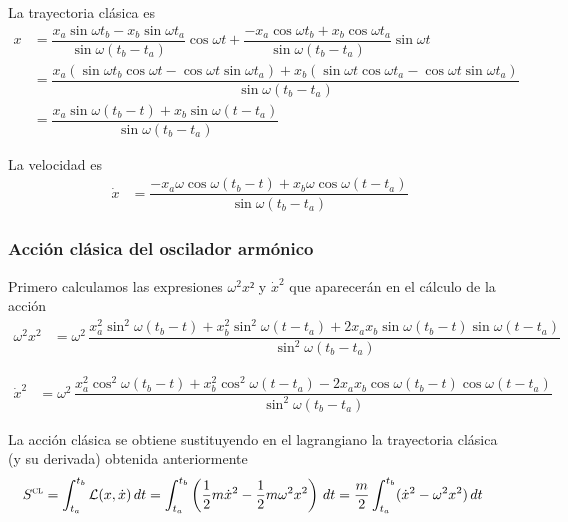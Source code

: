   La trayectoria clásica es
  \begin{align*}
    x
    &=
    \dfrac{x_a\sin\omega t_b-x_b\sin\omega t_a}{\sin\omega(t_b-t_a)} \cos\omega t
    +
    \dfrac{-x_a\cos\omega t_b+x_b\cos\omega t_a}{\sin\omega(t_b-t_a)} \sin\omega t\\
    &=
        \dfrac{x_a(\sin\omega t_b\cos\omega t-\cos\omega t \sin\omega t_a)
        + x_b(\sin\omega t \cos\omega t_a - \cos\omega t \sin\omega t_a)}
        {\sin\omega(t_b-t_a)}\\
    &=
      \dfrac{x_a\sin\omega (t_b-t) + x_b\sin\omega (t-t_a)}{\sin\omega(t_b-t_a)}
  \end{align*}

  La velocidad es
\begin{align*}
  \dot{x}
    &=
      \dfrac{-x_a\omega\cos\omega (t_b-t) + x_b\omega\cos\omega (t-t_a)}{\sin\omega(t_b-t_a)}
\end{align*}
  
\subsubsection{Acción clásica del oscilador armónico}
Primero calculamos las expresiones $\omega^2x²$ y $\dot{x}^2$ que
aparecerán en el cálculo de la acción
\begin{align*}
  \omega^2x^2
  &=
    \omega^2\,
    \dfrac{x_a^2\sin^2\omega(t_b-t)+x_b^2\sin^2\omega(t-t_a)+2x_ax_b\sin\omega(t_b-t)\sin\omega(t-t_a)}
    {\sin^2\omega(t_b-t_a)}
  \end{align*}
  
\begin{align*}
  \dot{x}^2
  &=
    \omega^2\,
    \dfrac{x_a^2\cos^2\omega(t_b-t)+x_b^2\cos^2\omega(t-t_a)-2x_ax_b\cos\omega(t_b-t)\cos\omega(t-t_a)}
    {\sin^2\omega(t_b-t_a)}
\end{align*}

La acción clásica se obtiene sustituyendo en el lagrangiano la
trayectoria clásica (y su derivada) obtenida anteriormente
\begin{align*}
   S^{\textsc{cl}}
   &=
   \int_{t_a}^{t_b}\mathcal{L}(x,\dot{x})\,dt
   =
   \int_{t_a}^{t_b}\left(\dfrac{1}{2}m\dot{x}^2-\dfrac{1}{2}m\omega^2x^2\right)\,dt
   = \dfrac{m}{2} \int_{t_a}^{t_b}(\dot{x}^2 - \omega^2 x^2)\,dt
 \end{align*}

